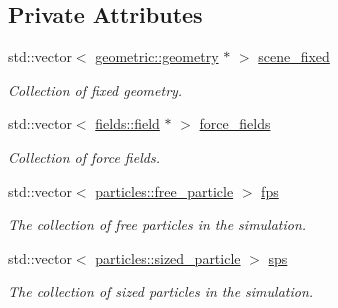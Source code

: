 \subsection*{Private Attributes}
\begin{DoxyCompactItemize}
\item 
std\+::vector$<$ \hyperlink{classphysim_1_1geometric_1_1geometry}{geometric\+::geometry} $\ast$ $>$ \hyperlink{classphysim_1_1simulator_a7ea652d4a55986d0c2cf527e40495fd8}{scene\+\_\+fixed}
\begin{DoxyCompactList}\small\item\em Collection of fixed geometry. \end{DoxyCompactList}\item 
\mbox{\label{classphysim_1_1simulator_a7e4d709f4b43199405be83eded074816}} 
std\+::vector$<$ \hyperlink{classphysim_1_1fields_1_1field}{fields\+::field} $\ast$ $>$ \hyperlink{classphysim_1_1simulator_a7e4d709f4b43199405be83eded074816}{force\+\_\+fields}
\begin{DoxyCompactList}\small\item\em Collection of force fields. \end{DoxyCompactList}\item 
\mbox{\label{classphysim_1_1simulator_a4f92b1da1d5e8e0c35d6339991b4d7ce}} 
std\+::vector$<$ \hyperlink{classphysim_1_1particles_1_1free__particle}{particles\+::free\+\_\+particle} $>$ \hyperlink{classphysim_1_1simulator_a4f92b1da1d5e8e0c35d6339991b4d7ce}{fps}
\begin{DoxyCompactList}\small\item\em The collection of free particles in the simulation. \end{DoxyCompactList}\item 
\mbox{\label{classphysim_1_1simulator_ad3bc00314e9fd8435125ff1225c0658b}} 
std\+::vector$<$ \hyperlink{classphysim_1_1particles_1_1sized__particle}{particles\+::sized\+\_\+particle} $>$ \hyperlink{classphysim_1_1simulator_ad3bc00314e9fd8435125ff1225c0658b}{sps}
\begin{DoxyCompactList}\small\item\em The collection of sized particles in the simulation. \end{DoxyCompactList}\item 
\mbox{\label{classphysim_1_1simulator_a838f036ef9d378d1e3f5207c3f031b52}} 

\end{DoxyCompactItemize}
